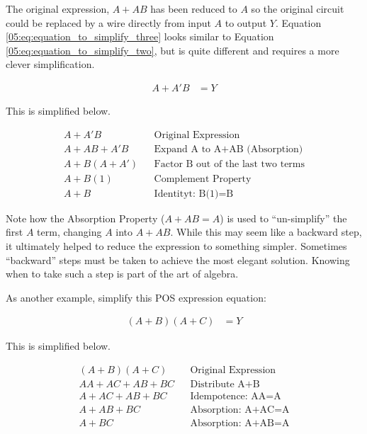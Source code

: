 The original expression, $ A+AB $ has been reduced to  $ A $ so the original circuit could be replaced by a wire directly from input  $ A $ to output  $ Y $. Equation \ref{05:eq:equation_to_simplify_three} looks similar to Equation \ref{05:eq:equation_to_simplify_two}, but is quite different and requires a more clever simplification.

\begin{align}
  \label{05:eq:equation_to_simplify_three}
  A+A'B &= Y
\end{align}

This is simplified below.

\begin{align}
  \label{05:soln:equation_to_simplify_three}
  A+A'B && \text{Original Expression} \\
  \nonumber
  A+AB+A'B && \text{Expand A to A+AB (Absorption)} \\
  \nonumber
  A+B(A+A') && \text{Factor B out of the last two terms} \\
  \nonumber
  A+B(1) && \text{Complement Property} \\
  \nonumber
  A+B && \text{Identityt: B(1)=B} 
\end{align}

Note how the Absorption Property ($ A + AB = A $) is used to ``un-simplify'' the first  $ A $ term, changing  $ A $ into $ A + AB $. While this may seem like a backward step, it ultimately helped to reduce the expression to something simpler. Sometimes ``backward'' steps must be taken to achieve the most elegant solution. Knowing when to take such a step is part of the art of algebra. 

As another example, simplify this \ac{POS} expression equation: 

\begin{align}
  \label{05:eq:equation_to_simplify_four}
  (A+B)(A+C) &= Y
\end{align}

This is simplified below.

\begin{align}
  \label{05:soln:equation_to_simplify_four}
  (A+B)(A+C) && \text{Original Expression} \\
  \nonumber
  AA+AC+AB+BC && \text{Distribute A+B} \\
  \nonumber
  A+AC+AB+BC && \text{Idempotence: AA=A} \\
  \nonumber
  A+AB+BC && \text{Absorption: A+AC=A} \\
  \nonumber
  A+BC && \text{Absorption: A+AB=A}
\end{align}


